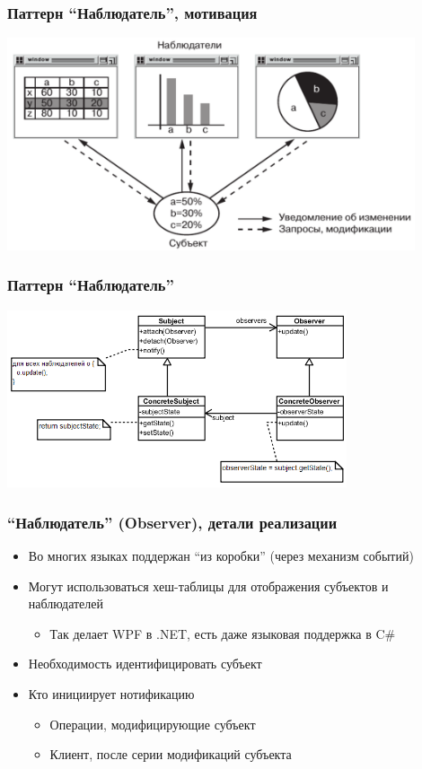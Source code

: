 \documentclass[xetex,mathserif,serif]{beamer}
\begin{document}
    \begin{frame}
        \frametitle{Паттерн ``Наблюдатель'', мотивация}
        \begin{center}
            \includegraphics[width=0.9\textwidth]{observerExample.png}
        \end{center}
    \end{frame}

    \begin{frame}
        \frametitle{Паттерн ``Наблюдатель''}
        \begin{center}
            \includegraphics[width=0.75\textwidth]{observer.png}
        \end{center}
    \end{frame}

    \begin{frame}
        \frametitle{``Наблюдатель'' (Observer), детали реализации}
        \begin{itemize}
            \item Во многих языках поддержан ``из коробки'' (через механизм событий)
            \item Могут использоваться хеш-таблицы для отображения субъектов и наблюдателей
            \begin{itemize}
                \item Так делает WPF в .NET, есть даже языковая поддержка в C\#
            \end{itemize}
            \item Необходимость идентифицировать субъект
            \item Кто инициирует нотификацию
            \begin{itemize}
                \item Операции, модифицирующие субъект
                \item Клиент, после серии модификаций субъекта
            \end{itemize}
        \end{itemize}
    \end{frame}
\end{document}
